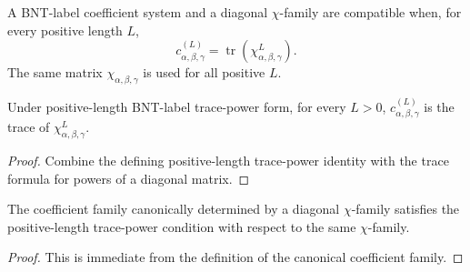\begin{definition}%
    \label{def:mpdo_bnt_label_positive_length_chi_trace_power_form}
    \leanok
    A BNT-label coefficient system and a diagonal $\chi$-family are
    compatible when, for every positive length $L$,
    \[
        c^{(L)}_{\alpha,\beta,\gamma}
        = \operatorname{tr}(\chi_{\alpha,\beta,\gamma}^{L}).
    \]
    The same matrix $\chi_{\alpha,\beta,\gamma}$ is used for all positive
    $L$.
\end{definition}

\begin{theorem}%
    \label{thm:mpdo_bnt_label_chi_eq_trace_matrix_pow}
    \leanok
    Under positive-length BNT-label trace-power form, for every $L>0$,
    $c^{(L)}_{\alpha,\beta,\gamma}$ is the trace of
    $\chi_{\alpha,\beta,\gamma}^{L}$.
\end{theorem}
\begin{proof}\leanok
    Combine the defining positive-length trace-power identity with the trace
    formula for powers of a diagonal matrix.
\end{proof}

\begin{theorem}%
    \label{thm:mpdo_bnt_label_of_chi_positive_length_trace_power}
    \leanok
    The coefficient family canonically determined by a diagonal
    $\chi$-family satisfies the positive-length trace-power condition with
    respect to the same $\chi$-family.
\end{theorem}
\begin{proof}\leanok
    This is immediate from the definition of the canonical coefficient family.
\end{proof}

